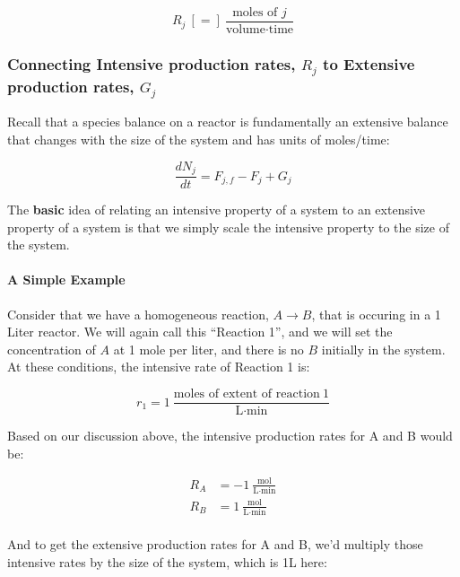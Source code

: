 \documentclass[11pt]{article}
\begin{document}
\[R_j \ [=] \ \frac{\text{moles of }j}{\text{volume} \cdot \text{time}}\]

    \hypertarget{connecting-intensive-production-rates-r_j-to-extensive-production-rates-g_j}{%
\subsubsection{\texorpdfstring{Connecting Intensive production rates,
\(R_j\) to Extensive production rates,
\(G_j\)}{Connecting Intensive production rates, R\_j to Extensive production rates, G\_j}}\label{connecting-intensive-production-rates-r_j-to-extensive-production-rates-g_j}}

Recall that a species balance on a reactor is fundamentally an extensive
balance that changes with the size of the system and has units of
moles/time:

\[\frac{dN_j}{dt} = F_{j,f} - F_j + G_j\]

The \textbf{basic} idea of relating an intensive property of a system to
an extensive property of a system is that we simply scale the intensive
property to the size of the system.

\hypertarget{a-simple-example}{%
\paragraph{A Simple Example}\label{a-simple-example}}

Consider that we have a homogeneous reaction, \(A \longrightarrow B\),
that is occuring in a 1 Liter reactor. We will again call this
``Reaction 1'', and we will set the concentration of \(A\) at 1 mole per
liter, and there is no \(B\) initially in the system. At these
conditions, the intensive rate of Reaction 1 is:

\[r_1 = 1 \ \frac{\text{moles of extent of reaction} \ 1}{\text{L} \cdot \text{min}}\]

Based on our discussion above, the intensive production rates for A and
B would be:

\begin{align}
    R_A &= -1 \ \frac{\text{mol}}{\text{L} \cdot \text{min}}\\
    R_B &= 1 \ \frac{\text{mol}}{\text{L} \cdot \text{min}}\\
\end{align}

And to get the extensive production rates for A and B, we'd multiply
those intensive rates by the size of the system, which is 1L here:
\end{document}
